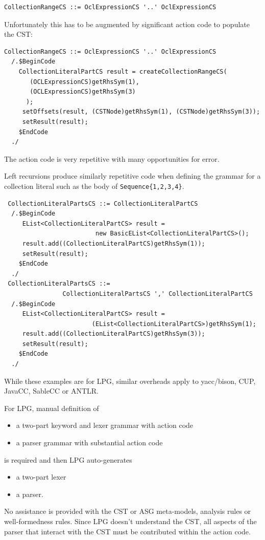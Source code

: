 \documentclass{eceasst}
\begin{document}
{\small\begin{verbatim}
CollectionRangeCS ::= OclExpressionCS '..' OclExpressionCS
\end{verbatim}}

Unfortunately this has to be augmented by significant action code to populate the CST:

{\small\begin{verbatim}
CollectionRangeCS ::= OclExpressionCS '..' OclExpressionCS
  /.$BeginCode
    CollectionLiteralPartCS result = createCollectionRangeCS(
       (OCLExpressionCS)getRhsSym(1),
       (OCLExpressionCS)getRhsSym(3)
      );
     setOffsets(result, (CSTNode)getRhsSym(1), (CSTNode)getRhsSym(3));
     setResult(result);
    $EndCode
  ./
\end{verbatim}}

The action code is very repetitive with many opportunities for error.

Left recursions produce similarly repetitive code when defining the grammar for a collection literal such as the body of \verb+Sequence{1,2,3,4}+.

{\small\begin{verbatim}
 CollectionLiteralPartsCS ::= CollectionLiteralPartCS
  /.$BeginCode
     EList<CollectionLiteralPartCS> result =
                         new BasicEList<CollectionLiteralPartCS>();
     result.add((CollectionLiteralPartCS)getRhsSym(1));
     setResult(result);
    $EndCode
  ./
 CollectionLiteralPartsCS ::=
                CollectionLiteralPartsCS ',' CollectionLiteralPartCS
  /.$BeginCode
     EList<CollectionLiteralPartCS> result =
                        (EList<CollectionLiteralPartCS>)getRhsSym(1);
     result.add((CollectionLiteralPartCS)getRhsSym(3));
     setResult(result);
    $EndCode
  ./
\end{verbatim}}

While these examples are for LPG, similar overheads apply to yacc/bison, CUP, JavaCC, SableCC or ANTLR.

For LPG, manual definition of
\begin{itemize}
\item a two-part keyword and lexer grammar with action code
\item a parser grammar with substantial action code
\end{itemize}
is required and then LPG auto-generates
\begin{itemize}
\item a two-part lexer 
\item a parser.
\end{itemize}
No assistance is provided with the CST or ASG meta-models, analysis rules or well-formedness rules. Since LPG doesn't understand the CST, all aspects of the parser that interact with the CST must be contributed within the action code.
\end{document}
